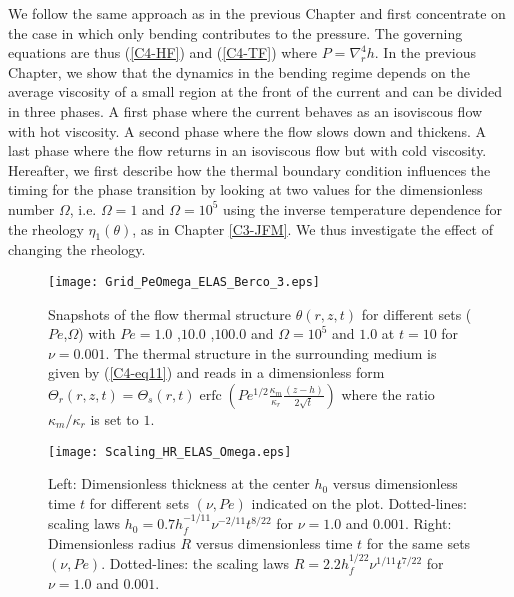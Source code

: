 We  follow the  same approach  as in  the previous  Chapter and  first
concentrate  on the  case in  which  only bending  contributes to  the
pressure.   The   governing  equations  are  thus   (\ref{C4-HF})  and
(\ref{C4-TF}) where  $P =  \nabla_r^4h$. In  the previous  Chapter, we
show that  the dynamics in the  bending regime depends on  the average
viscosity of  a small region  at the front of  the current and  can be
divided in three phases. A first phase where the current behaves as an
isoviscous flow  with hot  viscosity.  A second  phase where  the flow
slows down  and thickens.  A last  phase where the flow  returns in an
isoviscous flow but with cold viscosity.  Hereafter, we first describe
how the thermal boundary condition influences the timing for the phase
transition  by looking  at  two values  for  the dimensionless  number
$\Omega$,  i.e.   $\Omega=1$  and   $\Omega=10^5$  using  the  inverse
temperature  dependence  for  the  rheology  $\eta_1(\theta)$,  as  in
Chapter  \ref{C3-JFM}. We  thus investigate  the effect  of changing  the
rheology.

\begin{figure}[htpb]
  \begin{center}
    \graphicspath{ {/Users/thorey/Documents/These/Projet/Refroidissement/Skin_Model/Figure/Figure_Heating/} }
    \texttt{[image: Grid\_PeOmega\_ELAS\_Berco\_3.eps]}
    \caption{Snapshots of  the flow thermal  structure $\theta(r,z,t)$
      for  different  sets  ($Pe$,$\Omega$)  with  $Pe=  1.0$  ,$10.0$
      ,$100.0$   and   $\Omega=10^5$   and   $1.0$   at   $t=10$   for
      $\nu=0.001$. The thermal structure  in the surrounding medium is
      given  by  (\ref{C4-eq11})  and   reads  in  a  dimensionless  form
      $\Theta_r(r,z,t)=\Theta_s(r,t)\operatorname{erfc}{\left(Pe^{1/2}\frac{\kappa_m}{\kappa_r}\frac{(z-h)}{2\sqrt{t}}\right)}$
      where the ratio $\kappa_m/\kappa_r$ is set to $1$.}
    \label{C4-Grid_PeOmega_Heating}
  \end{center}
\end{figure}

\begin{figure}[htpb]
  \begin{center}
    \graphicspath{ {/Users/thorey/Documents/These/Projet/Refroidissement/Skin_Model/Figure/Figure_Heating/} }
    \texttt{[image: Scaling\_HR\_ELAS\_Omega.eps]}
    \caption{Left: Dimensionless thickness at  the center $h_0$ versus
      dimensionless time  $t$ for different sets  $(\nu,Pe)$ indicated
      on      the      plot.      Dotted-lines:      scaling      laws
      $h_0=  0.7h_f^{-1/11}\nu^{-2/11}t^{8/22}$ for  $\nu  = 1.0$  and
      $0.001$.  Right:  Dimensionless radius $R$  versus dimensionless
      time  $t$  for  the  same sets  $(\nu,Pe)$.   Dotted-lines:  the
      scaling    laws    $R=   2.2h_f^{1/22}\nu^{1/11}t^{7/22}$    for
      $\nu = 1.0$ and $0.001$.}
    \label{C4-Scaling_HR_ELAS_Omega}
  \end{center}
\end{figure}
